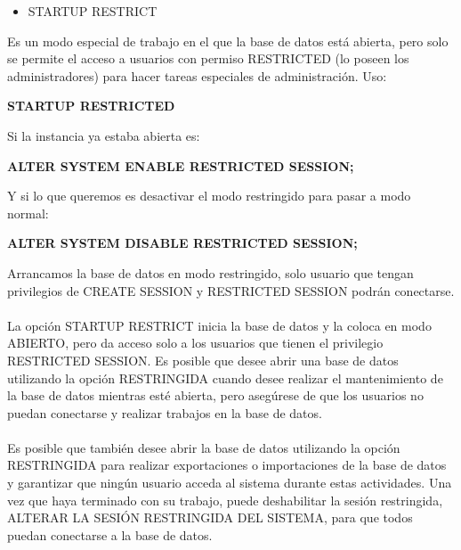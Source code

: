 \begin{itemize}
	\item STARTUP RESTRICT  
\end{itemize}
\begin{adjustwidth}{0.40in}{0.0in}
	Es un modo especial de trabajo en el que la base de datos está abierta, pero solo se permite el acceso a usuarios con permiso RESTRICTED (lo poseen los administradores) para hacer tareas especiales de administración. Uso:\\
	\begin{center}
		\textbf{\large STARTUP RESTRICTED}		
	\end{center}
	\vspace{\baselineskip}
	Si la instancia ya estaba abierta es:\\
	\begin{center}
		\textbf{\large ALTER SYSTEM ENABLE RESTRICTED SESSION;}		
	\end{center} 

	Y si lo que queremos es desactivar el modo restringido para pasar a modo normal:\\
	\begin{center}
		\textbf{\large ALTER SYSTEM DISABLE RESTRICTED SESSION;}		
	\end{center}
	\vspace{\baselineskip}
	Arrancamos la base de datos en modo restringido, solo usuario que tengan privilegios de CREATE SESSION y RESTRICTED SESSION podrán conectarse.\\ \\
	La opción STARTUP RESTRICT inicia la base de datos y la coloca en modo ABIERTO, pero da acceso solo a los usuarios que tienen el privilegio RESTRICTED SESSION. Es posible que desee abrir una base de datos utilizando la opción RESTRINGIDA cuando desee realizar el mantenimiento de la base de datos mientras esté abierta, pero asegúrese de que los usuarios no puedan conectarse y realizar trabajos en la base de datos.\\ \\
	Es posible que también desee abrir la base de datos utilizando la opción RESTRINGIDA para realizar exportaciones o importaciones de la base de datos y garantizar que ningún usuario acceda al sistema durante estas actividades. Una vez que haya terminado con su trabajo, puede deshabilitar la sesión restringida, ALTERAR LA SESIÓN RESTRINGIDA DEL SISTEMA, para que todos puedan conectarse a la base de datos.\\
\\
	
\end{adjustwidth}


